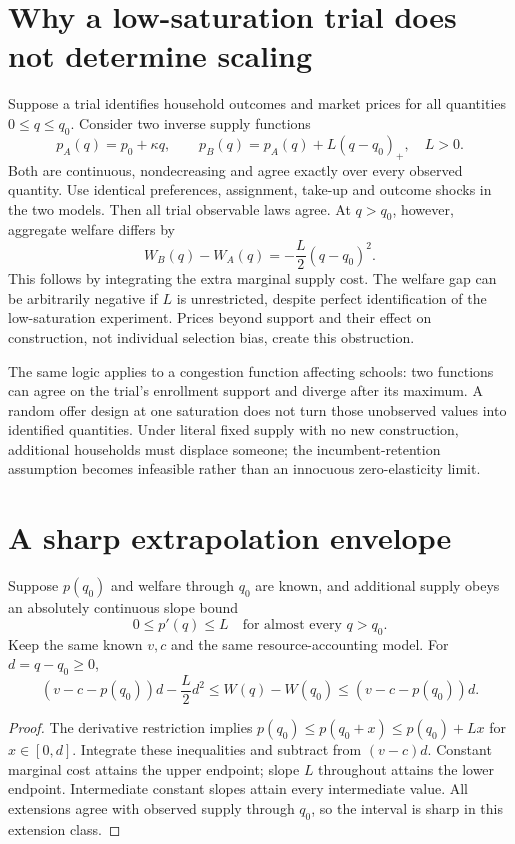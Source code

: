 \documentclass[11pt,a4paper]{article}
\begin{document}
\section{Why a low-saturation trial does not determine scaling}
Suppose a trial identifies household outcomes and market prices for all quantities $0\le q\le q_0$. Consider two inverse supply functions
\[
 p_A(q)=p_0+\kappa q,\qquad
 p_B(q)=p_A(q)+L(q-q_0)_+,\quad L>0.                       \tag{3}
\]
Both are continuous, nondecreasing and agree exactly over every observed quantity. Use identical preferences, assignment, take-up and outcome shocks in the two models. Then all trial observable laws agree. At $q>q_0$, however, aggregate welfare differs by
\[
 W_B(q)-W_A(q)=-\frac L2(q-q_0)^2.                         \tag{4}
\]
This follows by integrating the extra marginal supply cost. The welfare gap can be arbitrarily negative if $L$ is unrestricted, despite perfect identification of the low-saturation experiment. Prices beyond support and their effect on construction, not individual selection bias, create this obstruction.

The same logic applies to a congestion function affecting schools: two functions can agree on the trial's enrollment support and diverge after its maximum. A random offer design at one saturation does not turn those unobserved values into identified quantities. Under literal fixed supply with no new construction, additional households must displace someone; the incumbent-retention assumption becomes infeasible rather than an innocuous zero-elasticity limit.

\section{A sharp extrapolation envelope}
Suppose $p(q_0)$ and welfare through $q_0$ are known, and additional supply obeys an absolutely continuous slope bound
\[
 0\le p'(q)\le L\quad\text{for almost every }q>q_0.
\]
Keep the same known $v,c$ and the same resource-accounting model. For $d=q-q_0\ge0$,
\[
 (v-c-p(q_0))d-\frac L2d^2
 \le W(q)-W(q_0)\le(v-c-p(q_0))d.                         \tag{5}
\]
\begin{proof}
The derivative restriction implies
$p(q_0)\le p(q_0+x)\le p(q_0)+Lx$ for $x\in[0,d]$. Integrate these inequalities and subtract from $(v-c)d$. Constant marginal cost attains the upper endpoint; slope $L$ throughout attains the lower endpoint. Intermediate constant slopes attain every intermediate value. All extensions agree with observed supply through $q_0$, so the interval is sharp in this extension class.
\end{proof}
\end{document}
